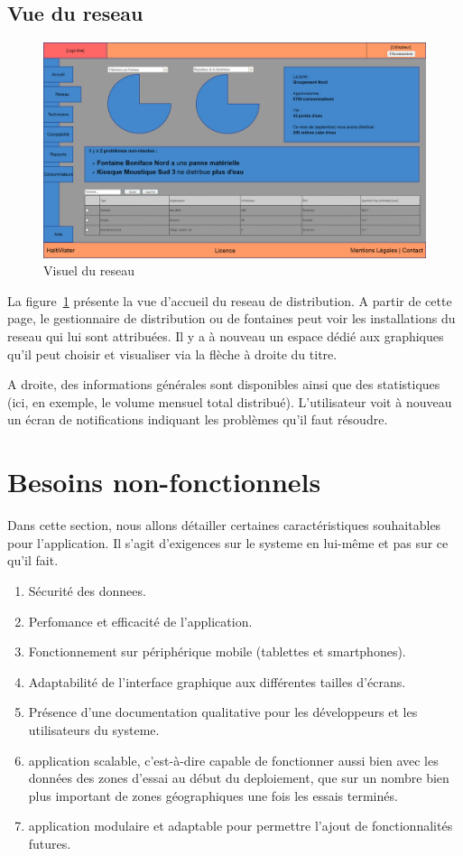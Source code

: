\documentclass[a4paper, 11pt]{article}
\begin{document}
  \subsection{Vue du \gls{reseau}}
    \begin{figure}[H]
        \centering
        \includegraphics[width=.8\textwidth]{Cahier_des_Charges/reseau}
        \caption{Visuel du \gls{reseau}}
        \label{fig:network}
    \end{figure}
    La figure~\ref{fig:network} présente la vue d'accueil du \gls{reseau} de distribution. A partir de cette page, le gestionnaire de distribution ou de \glspl{fontaine} peut voir les installations du \gls{reseau} qui lui sont attribuées. Il y a à nouveau un espace dédié aux graphiques qu'il peut choisir et visualiser via la flèche à droite du titre.

    A droite, des informations générales sont disponibles ainsi que des statistiques (ici, en exemple, le volume mensuel total distribué).
    L'\gls{utilisateur} voit à nouveau un écran de notifications indiquant les problèmes qu'il faut résoudre.

\section{Besoins non-fonctionnels}
Dans cette section, nous allons détailler certaines caractéristiques souhaitables pour l'\gls{application}. Il s'agit d'exigences sur le \gls{systeme} en lui-même et pas sur ce qu'il fait.
\begin{enumerate}
  \item Sécurité des \glspl{donnee}.
  \item Perfomance et efficacité de l'application.
  \item Fonctionnement sur périphérique mobile (tablettes et smartphones).
  \item Adaptabilité de l'interface graphique aux différentes tailles d'écrans.
  \item Présence d'une documentation qualitative pour les développeurs et les \glspl{utilisateur} du \gls{systeme}.
  \item \Ac{application} \gls{scalable}, c'est-à-dire capable de fonctionner aussi bien avec les données des zones d'essai au début du \gls{deploiement}, que sur un nombre bien plus important de zones géographiques une fois les essais terminés.
  \item \Ac{application} \gls{modulaire} et adaptable pour permettre l'ajout de fonctionnalités futures.
\end{enumerate}
\end{document}
